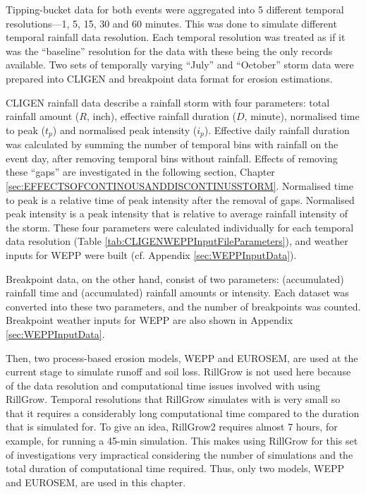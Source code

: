 Tipping-bucket data for both events were aggregated into 5 different temporal
resolutions---1, 5, 15, 30 and 60 minutes. This was done to simulate different
temporal rainfall data resolution. Each temporal resolution was treated as if it
was the
``baseline'' resolution for the data with these being the only records
available. Two
sets of temporally varying ``July'' and ``October'' storm data were prepared
into CLIGEN and breakpoint data format for erosion estimations.

CLIGEN rainfall data describe a rainfall storm with four parameters: total
rainfall amount ($R$, inch), effective rainfall duration ($D$, minute),
normalised time to peak ($t_p$) and normalised peak intensity ($i_p$). Effective
daily rainfall duration was calculated by summing the number of temporal bins
with rainfall on the event day, after removing temporal bins without rainfall.
Effects of removing these ``gaps'' are investigated in the following section,
Chapter \ref{sec:EFFECTSOFCONTINOUSANDDISCONTINUSSTORM}. Normalised time to
peak is a relative time of peak intensity after the removal of gaps.
Normalised peak intensity is a peak intensity that is relative to average
rainfall intensity of the storm. These four parameters were calculated
individually for each temporal data resolution (Table
\ref{tab:CLIGENWEPPInputFileParameters}), and weather inputs for WEPP were
built (cf. Appendix \ref{sec:WEPPInputData}).

Breakpoint data, on the other hand, consist of two parameters: (accumulated)
rainfall time and (accumulated) rainfall amounts or intensity. Each dataset was
converted into these two parameters, and the number of breakpoints was counted.
Breakpoint weather inputs for WEPP are also shown in Appendix
\ref{sec:WEPPInputData}.

Then, two process-based erosion models, WEPP and EUROSEM, are used at the
current stage to simulate runoff and soil loss. RillGrow is not used here
because of the data resolution and computational time issues involved
with using RillGrow. Temporal resolutions that RillGrow simulates with is very
small
so that it requires a considerably long computational time compared to the
duration that is simulated for. To give an idea, RillGrow2 requires almost 7
hours, for example, for running a 45-min simulation. This makes using RillGrow
for this set of investigations very impractical considering the number of
simulations and the total duration of computational time required. Thus, only
two models, WEPP and EUROSEM, are used in this chapter.

